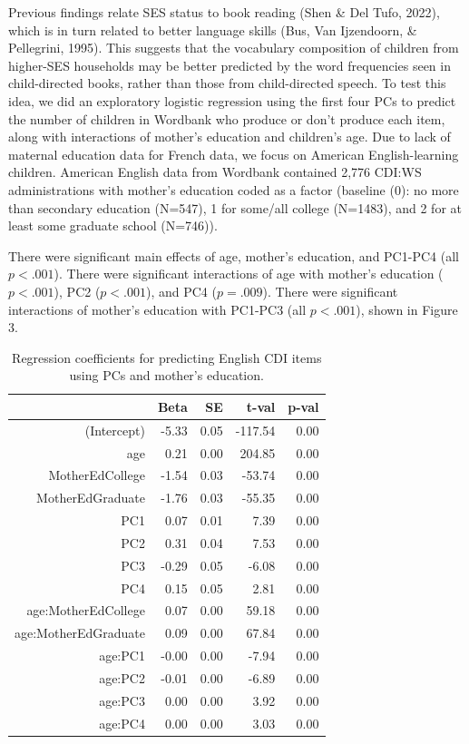 \documentclass[10pt, letterpaper]{article}
\begin{document}
Previous findings relate SES status to book reading (Shen \& Del Tufo,
2022), which is in turn related to better language skills (Bus, Van
Ijzendoorn, \& Pellegrini, 1995). This suggests that the vocabulary
composition of children from higher-SES households may be better
predicted by the word frequencies seen in child-directed books, rather
than those from child-directed speech. To test this idea, we did an
exploratory logistic regression using the first four PCs to predict the
number of children in Wordbank who produce or don't produce each item,
along with interactions of mother's education and children's age. Due to
lack of maternal education data for French data, we focus on American
English-learning children. American English data from Wordbank contained
2,776 CDI:WS administrations with mother's education coded as a factor
(baseline (0): no more than secondary education (N=547), 1 for some/all
college (N=1483), and 2 for at least some graduate school (N=746)).

There were significant main effects of age, mother's education, and
PC1-PC4 (all \(p<.001\)). There were significant interactions of age
with mother's education (\(p<.001\)), PC2 (\(p<.001\)), and PC4
(\(p=.009\)). There were significant interactions of mother's education
with PC1-PC3 (all \(p<.001\)), shown in Figure 3.

\begin{table}[ht]
\centering
\begin{tabular}{rrrrr}
  \hline
 & Beta & SE & t-val & p-val \\ 
  \hline
(Intercept) & -5.33 & 0.05 & -117.54 & 0.00 \\ 
  age & 0.21 & 0.00 & 204.85 & 0.00 \\ 
  MotherEdCollege & -1.54 & 0.03 & -53.74 & 0.00 \\ 
  MotherEdGraduate & -1.76 & 0.03 & -55.35 & 0.00 \\ 
  PC1 & 0.07 & 0.01 & 7.39 & 0.00 \\ 
  PC2 & 0.31 & 0.04 & 7.53 & 0.00 \\ 
  PC3 & -0.29 & 0.05 & -6.08 & 0.00 \\ 
  PC4 & 0.15 & 0.05 & 2.81 & 0.00 \\ 
  age:MotherEdCollege & 0.07 & 0.00 & 59.18 & 0.00 \\ 
  age:MotherEdGraduate & 0.09 & 0.00 & 67.84 & 0.00 \\ 
  age:PC1 & -0.00 & 0.00 & -7.94 & 0.00 \\ 
  age:PC2 & -0.01 & 0.00 & -6.89 & 0.00 \\ 
  age:PC3 & 0.00 & 0.00 & 3.92 & 0.00 \\ 
  age:PC4 & 0.00 & 0.00 & 3.03 & 0.00 \\ 
   \hline
\end{tabular}
\caption{Regression coefficients for predicting English CDI items using PCs and mother's education.} 
\end{table}
\end{document}
